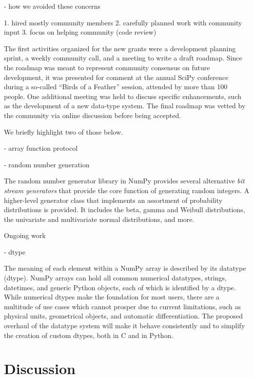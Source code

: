- how we avoided these concerns

1. hired mostly community members
2. carefully planned work with community input
3. focus on helping community (code review)


The first activities organized for the new grants were a development planning
sprint, a weekly community call, and a meeting to write a draft roadmap.
Since the roadmap was meant to represent community consensus on future
development, it was presented for comment at the annual SciPy
conference during a so-called ``Birds of a Feather'' session, attended
by more than 100 people.  One additional meeting was held to discuss
specific enhancements, such as the development of a new data-type
system.  The final roadmap was vetted by the community via online
discussion before being accepted.

We briefly highlight two of those below.

- array function protocol

- random number generation

The random number generator library in NumPy provides several alternative
\emph{bit stream generators} that provide the core function of generating
random integers.
A higher-level generator class that implements an assortment of
probability distributions is provided. It includes the beta, gamma
and Weibull distributions, the univariate and multivariate normal
distributions, and more.

Ongoing work

- dtype

The meaning of each element within a NumPy array is described by its
datatype (dtype). NumPy arrays can hold all common numerical
datatypes, strings, datetimes, and generic Python objects, each of
which is identified by a dtype.
While numerical dtypes make the foundation for most users,
there are a multitude of use cases which cannot prosper due to current
limitations, such as physical units\cite{astropy,Goldbaum2018,pint},
geometrical objects\cite{pygeos}, and automatic
differentiation\cite{pyadolc}.
The proposed overhaul of the datatype system will make it behave consistently and
to simplify the creation of custom dtypes, both in C and in Python.

\section*{Discussion}
